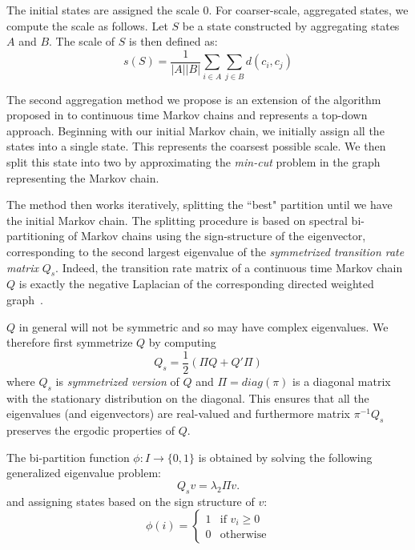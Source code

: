 The initial states are assigned the scale $0$. For coarser-scale, aggregated states, we compute the scale as follows. Let $S$ be a state constructed by aggregating states $A$ and $B$.  The scale of $S$ is then defined as:
\begin{equation}
	\nonumber
	s(S) = \frac{1}{\left|A\right|\left|B\right|}\sum\limits_{i \in A}\sum\limits_{j \in B} d(c_i,c_j)
\end{equation}

The second aggregation method we propose is an extension of the algorithm proposed in  to continuous time Markov chains and represents a top-down approach. Beginning with our initial Markov chain, we initially assign all the states into a single state. This represents the coarsest possible scale. We then split this state into two by approximating the \emph{min-cut} problem in the graph representing the Markov chain. 

The method then works iteratively, splitting the ``best" partition until we have the initial Markov chain.
%
The splitting procedure is based on spectral bi-partitioning of Markov chains using the sign-structure of the eigenvector, corresponding to the second largest eigenvalue of the \emph{symmetrized transition rate matrix} $Q_s$. Indeed,  the transition rate matrix of a continuous time Markov chain $Q$ is exactly the negative Laplacian of the corresponding directed weighted graph~\cite{Agaev2005157}.

$Q$ in general will not be symmetric and so may have complex eigenvalues. We therefore first symmetrize $Q$ by computing
\begin{equation}
	\nonumber
	Q_s = \frac{1}{2}(\Pi Q + Q' \Pi)
\end{equation}
where $Q_s$ is \emph{symmetrized version} of $Q$ and $\Pi = diag(\pi)$ is a diagonal matrix with the stationary distribution on the diagonal. This ensures that all the eigenvalues (and eigenvectors) are real-valued and furthermore matrix $\pi^{-1}Q_s$ preserves the ergodic properties of $Q$. 

The bi-partition function $\phi: I \rightarrow \{0,1\}$ is obtained by solving the following generalized eigenvalue problem:
\begin{equation}
	Q_s v = \lambda_2 \Pi v.
\end{equation}
and assigning states based on the sign structure of $v$:
\begin{equation}
	\nonumber
	\phi(i) = 
		\left\{
			\begin{array}{ll}
				1 & \mbox{if } v_i \ge 0 \\
				0 & \mbox{otherwise}
			\end{array}
		\right.
\end{equation}

